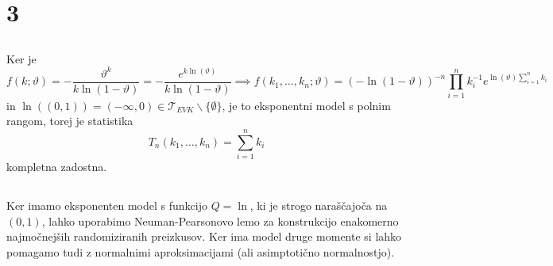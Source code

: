 \documentclass[ letterpaper, titlepage, fleqn]{article}
\newcommand{\T}{\mathscr T}
\begin{document}
\section{3}
\subsection{}
Ker je
$$
f(k; \vartheta) = -\frac{\vartheta^k}{k\ln(1-\vartheta)} = -\frac{e^{k\ln(\vartheta)}}{k\ln(1-\vartheta)} \implies 
f(k_1, \dots, k_n; \vartheta) = (-\ln(1-\vartheta))^{-n} \prod_{i=1}^n k_i^{-1} e^{\ln(\vartheta) \sum_{i=1}^n k_i}
$$
in $\ln((0,1))  = (-\infty, 0) \in \T_{EVK} \smallsetminus \{\emptyset\}$, je to eksponentni model s polnim rangom, 
torej je statistika 
$$T_n(k_1, \dots, k_n) = \sum_{i=1}^n k_i$$
kompletna zadostna.

\subsection{}
Ker imamo eksponenten model s funkcijo $Q = \ln$, ki je strogo naraščajoča na $(0,1)$, lahko uporabimo Neuman-Pearsonovo
lemo za konstrukcijo enakomerno najmočnejših randomiziranih preizkusov. 
Ker ima model druge momente si lahko pomagamo tudi z normalnimi aproksimacijami (ali asimptotično normalnostjo).
\end{document}

